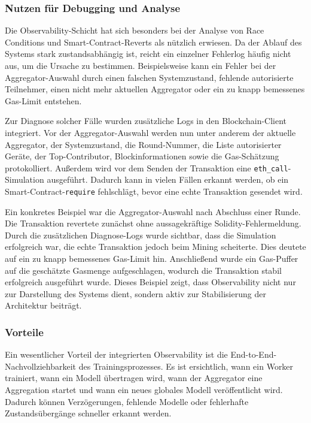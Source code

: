 \subsubsection{Nutzen für Debugging und Analyse}

Die Observability-Schicht hat sich besonders bei der Analyse von Race Conditions und Smart-Contract-Reverts als nützlich erwiesen. Da der Ablauf des Systems stark zustandsabhängig ist, reicht ein einzelner Fehlerlog häufig nicht aus, um die Ursache zu bestimmen. Beispielsweise kann ein Fehler bei der Aggregator-Auswahl durch einen falschen Systemzustand, fehlende autorisierte Teilnehmer, einen nicht mehr aktuellen Aggregator oder ein zu knapp bemessenes Gas-Limit entstehen.

Zur Diagnose solcher Fälle wurden zusätzliche Logs in den Blockchain-Client integriert. Vor der Aggregator-Auswahl werden nun unter anderem der aktuelle Aggregator, der Systemzustand, die Round-Nummer, die Liste autorisierter Geräte, der Top-Contributor, Blockinformationen sowie die Gas-Schätzung protokolliert. Außerdem wird vor dem Senden der Transaktion eine \texttt{eth\_call}-Simulation ausgeführt. Dadurch kann in vielen Fällen erkannt werden, ob ein Smart-Contract-\texttt{require} fehlschlägt, bevor eine echte Transaktion gesendet wird.

Ein konkretes Beispiel war die Aggregator-Auswahl nach Abschluss einer Runde. Die Transaktion revertete zunächst ohne aussagekräftige Solidity-Fehlermeldung. Durch die zusätzlichen Diagnose-Logs wurde sichtbar, dass die Simulation erfolgreich war, die echte Transaktion jedoch beim Mining scheiterte. Dies deutete auf ein zu knapp bemessenes Gas-Limit hin. Anschließend wurde ein Gas-Puffer auf die geschätzte Gasmenge aufgeschlagen, wodurch die Transaktion stabil erfolgreich ausgeführt wurde. Dieses Beispiel zeigt, dass Observability nicht nur zur Darstellung des Systems dient, sondern aktiv zur Stabilisierung der Architektur beiträgt.

\subsubsection{Vorteile}

Ein wesentlicher Vorteil der integrierten Observability ist die End-to-End-Nachvollziehbarkeit des Trainingsprozesses. Es ist ersichtlich, wann ein Worker trainiert, wann ein Modell übertragen wird, wann der Aggregator eine Aggregation startet und wann ein neues globales Modell veröffentlicht wird. Dadurch können Verzögerungen, fehlende Modelle oder fehlerhafte Zustandsübergänge schneller erkannt werden.

